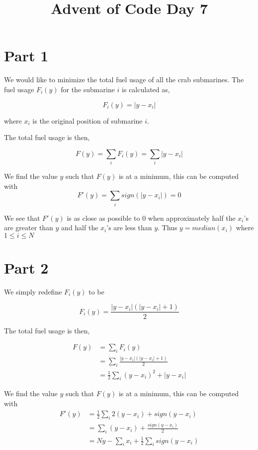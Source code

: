 \documentclass{article}
\title{Advent of Code Day 7}
\begin{document}
\setlength{\parindent}{0ex}

\section{Part 1}
We would like to minimize the total fuel usage of all the crab submarines.
The fuel usage \(F_i(y)\) for the submarine \(i\) is calculated as,

\begin{equation}
    F_i(y) = |y - x_i|
\end{equation}

where \(x_i\) is the original position of submarine \(i\).

The total fuel usage is then,

\begin{equation}
    F(y) = \sum_{i} F_i(y) = \sum_{i} |y - x_i|
\end{equation}

We find the value \(y\) such that \(F(y)\) is at a minimum, this can be computed
with
\begin{equation}
    F'(y) = \sum_{i} sign(|y - x_i|) = 0
\end{equation}

We see that \(F'(y)\) is as close as possible to \(0\) when approximately
half the \(x_i\)'s are greater than \(y\) and half the \(x_i\)'s are less than
\(y\). Thus \(y = median(x_i)\) where \(1 \leq i \leq N\)

\section{Part 2}

We simply redefine \(F_i(y)\) to be

\begin{equation}
    F_i(y) = \frac{|y - x_i| (|y - x_i| + 1)}{2}
\end{equation}

The total fuel usage is then,

\begin{align}
    F(y) &= \sum_{i} F_i(y)\\
    &= \sum_{i} \frac{|y - x_i| (|y - x_i| + 1)}{2}\\
    &= \frac{1}{2}\sum_{i} (y - x_i)^2 + |y - x_i|
\end{align}


We find the value \(y\) such that \(F(y)\) is at a minimum, this can be computed
with
\begin{align}
    F'(y) &= \frac{1}{2}\sum_{i} 2(y - x_i) + sign(y - x_i)\\
    &= \sum_{i} (y - x_i) + \frac{sign(y - x_i)}{2}\\
    &= Ny - \sum_{i}x_i + \frac{1}{2}\sum_{i} sign(y - x_i)
\end{align}
\end{document}
